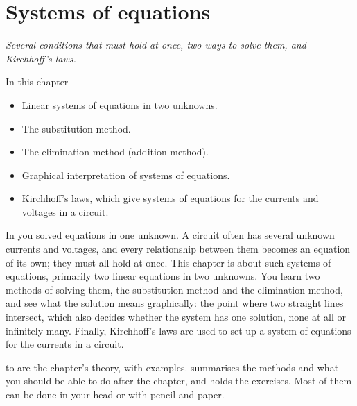 
\chapter{Systems of equations}
\label{c4:ch}

{\large\itshape Several conditions that must hold at once, two ways to solve them, and Kirchhoff's
laws.\par}

\begin{chapterbox}{In this chapter}
\begin{itemize}
  \item Linear systems of equations in two unknowns.
  \item The substitution method.
  \item The elimination method (addition method).
  \item Graphical interpretation of systems of equations.
  \item Kirchhoff's laws, which give systems of equations for the currents and voltages in a
    circuit.
\end{itemize}
\end{chapterbox}

In  you solved equations in one unknown. A circuit often has several unknown currents
and voltages, and every relationship between them becomes an equation of its own; they must all
hold at once. This chapter is about such systems of equations, primarily two linear equations in
two unknowns. You learn two methods of solving them, the substitution method and the elimination
method, and see what the solution means graphically: the point where two straight lines
intersect, which also decides whether the system has one solution, none at all or infinitely
many. Finally, Kirchhoff's laws are used to set up a system of equations for the currents in a
circuit.

 to  are the chapter's theory, with
examples.  summarises the methods and what you should be able to do
after the chapter, and  holds the exercises. Most of them can be done in
your head or with pencil and paper.




